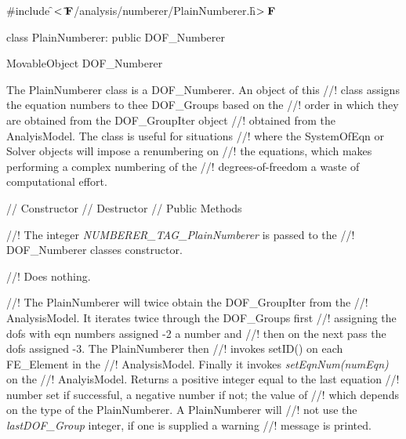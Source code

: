 
\indent \#include \f$<\tilde{ }{\bf F}$/analysis/numberer/PlainNumberer.h\f$>{\bf F}$

\indent class PlainNumberer: public DOF\_Numberer

\indent MovableObject
\indent\indent DOF\_Numberer
\indent\indent{}

\indent The PlainNumberer class is a DOF\_Numberer. An object of this
//! class assigns the equation numbers to thee DOF\_Groups based on the
//! order in which they are obtained from the DOF\_GroupIter object
//! obtained from the AnalyisModel. The class is useful for situations
//! where the SystemOfEqn or Solver objects will impose a renumbering on
//! the equations, which makes performing a complex numbering of the
//! degrees-of-freedom a waste of computational effort.


\indent // Constructor
\indent // Destructor
\indent // Public Methods


//! The integer {\em NUMBERER\_TAG\_PlainNumberer} is passed to the
//! DOF\_Numberer classes constructor.

//! Does nothing.

//! The PlainNumberer will twice obtain the DOF\_GroupIter from the
//! AnalysisModel. It iterates twice through the DOF\_Groups first
//! assigning the dofs with eqn numbers assigned -2 a number and 
//! then on the next pass the dofs assigned -3. The PlainNumberer then
//! invokes setID() on each FE\_Element in the
//! AnalysisModel. Finally it invokes {\em setEqnNum(numEqn)} on the
//! AnalyisModel. Returns a positive integer equal to the last equation
//! number set if successful, a negative number if not; the value of 
//! which depends on the type of the PlainNumberer. A PlainNumberer will
//! not use the {\em lastDOF\_Group} integer, if one is supplied a warning
//! message is printed. 

